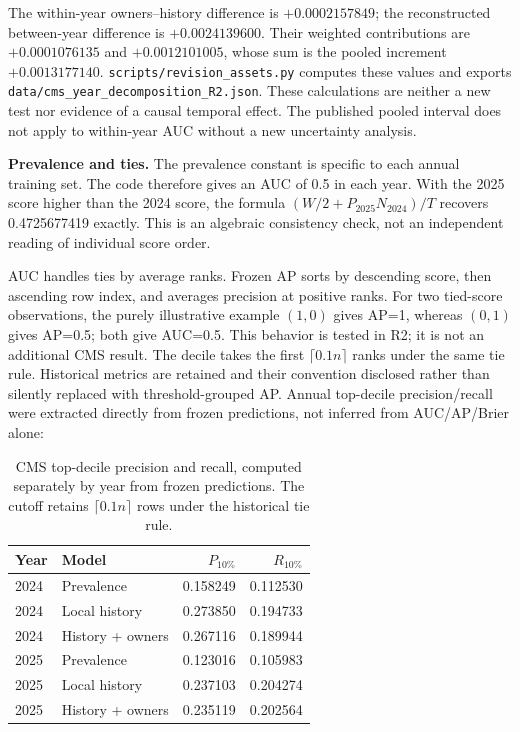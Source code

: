 \documentclass[10pt,a4paper]{article}
\newcommand{\src}[1]{{\small\nolinkurl{#1}}}
\begin{document}
\begin{table}[!htbp]\centering\small
\caption{R2 decomposition. Between-year AUC is reconstructed from the other terms, not reevaluated on predictions.}

\end{table}

The within-year owners--history difference is $+0.0002157849$; the reconstructed between-year difference is $+0.0024139600$. Their weighted contributions are $+0.0001076135$ and $+0.0012101005$, whose sum is the pooled increment $+0.0013177140$. \src{scripts/revision_assets.py} computes these values and exports \src{data/cms_year_decomposition_R2.json}. These calculations are neither a new test nor evidence of a causal temporal effect. The published pooled interval does not apply to within-year AUC without a new uncertainty analysis.

\textbf{Prevalence and ties.} The prevalence constant is specific to each annual training set. The code therefore gives an AUC of 0.5 in each year. With the 2025 score higher than the 2024 score, the formula $(W/2+P_{2025}N_{2024})/T$ recovers 0.4725677419 exactly. This is an algebraic consistency check, not an independent reading of individual score order.

AUC handles ties by average ranks. Frozen AP sorts by descending score, then ascending row index, and averages precision at positive ranks. For two tied-score observations, the purely illustrative example $(1,0)$ gives AP=1, whereas $(0,1)$ gives AP=0.5; both give AUC=0.5. This behavior is tested in R2; it is not an additional CMS result. The decile takes the first $\lceil0.1n\rceil$ ranks under the same tie rule. Historical metrics are retained and their convention disclosed rather than silently replaced with threshold-grouped AP. Annual top-decile precision/recall were extracted directly from frozen predictions, not inferred from AUC/AP/Brier alone:
\begin{table}[!htbp]\centering\small
\caption{CMS top-decile precision and recall, computed separately by year from frozen predictions. The cutoff retains $\lceil0.1n\rceil$ rows under the historical tie rule.}
\begin{tabular}{@{}llrr@{}}
\toprule
Year & Model & $P_{10\%}$ & $R_{10\%}$\\
\midrule
2024 & Prevalence & 0.158249 & 0.112530\\
2024 & Local history & 0.273850 & 0.194733\\
2024 & History + owners & 0.267116 & 0.189944\\
2025 & Prevalence & 0.123016 & 0.105983\\
2025 & Local history & 0.237103 & 0.204274\\
2025 & History + owners & 0.235119 & 0.202564\\
\bottomrule
\end{tabular}
\end{table}
\end{document}
